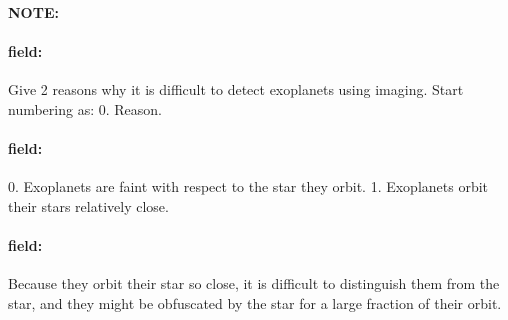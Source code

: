 \documentclass[12pt]{article}
\newenvironment{note}{\paragraph{NOTE:}}{}
\newenvironment{field}{\paragraph{field:}}{}
\begin{document}
\begin{note}
   \begin{field}
       Give 2 reasons why it  is difficult to detect exoplanets using imaging. Start numbering as: 0. Reason.
   \end{field}
   \begin{field}
		0. Exoplanets are faint with respect to the star they orbit.
		1. Exoplanets orbit their stars relatively close.
   \end{field}
   \begin{field}
		Because they orbit their star so close, it is difficult to distinguish them from the star, and they might be obfuscated by the star for a large fraction of their orbit.
   \end{field}
\end{note}
\end{document}
